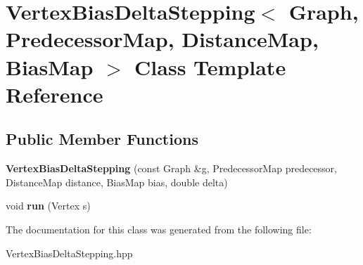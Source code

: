 \hypertarget{a00130}{}\section{Vertex\+Bias\+Delta\+Stepping$<$ Graph, Predecessor\+Map, Distance\+Map, Bias\+Map $>$ Class Template Reference}
\label{a00130}
\subsection*{Public Member Functions}
\begin{DoxyCompactItemize}
\item 
{\bfseries Vertex\+Bias\+Delta\+Stepping} (const Graph \&g, Predecessor\+Map predecessor, Distance\+Map distance, Bias\+Map bias, double delta)\hypertarget{a00130_a49fd30c46349eac3b2e7ce3fb26a0902}{}\label{a00130_a49fd30c46349eac3b2e7ce3fb26a0902}

\item 
void {\bfseries run} (Vertex s)\hypertarget{a00130_afdd3b9b7a0b356b62d3124a5b642ec63}{}\label{a00130_afdd3b9b7a0b356b62d3124a5b642ec63}

\end{DoxyCompactItemize}


The documentation for this class was generated from the following file\+:\begin{DoxyCompactItemize}
\item 
Vertex\+Bias\+Delta\+Stepping.\+hpp\end{DoxyCompactItemize}
